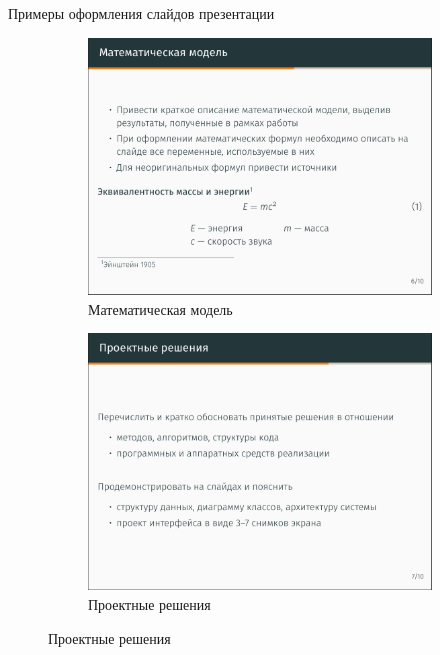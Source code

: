 \documentclass{../cls/fefu_presentation}
\begin{document}
    \note{}
    
    \begin{frame}{Примеры оформления слайдов презентации}
        \begin{figure}[h]
            \centering
            \begin{subfigure}[t]{0.49\textwidth}
                \includegraphics[width=\textwidth]{slide1.png}
                \caption{Математическая модель}
            \end{subfigure}
            \begin{subfigure}[t]{0.49\textwidth}
                \includegraphics[width=\textwidth]{slide2.png}
                \caption{Проектные решения}
            \end{subfigure}
        \end{figure}
    \end{frame}
\end{document}

